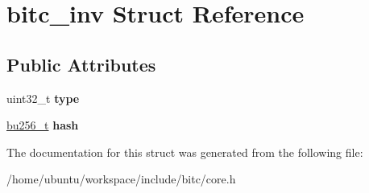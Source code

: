\hypertarget{structbitc__inv}{\section{bitc\-\_\-inv Struct Reference}
\label{structbitc__inv}
}
\subsection*{Public Attributes}
\begin{DoxyCompactItemize}
\item 
\hypertarget{structbitc__inv_abbb12745778b66b39d7472cb221ea79b}{uint32\-\_\-t {\bfseries type}}\label{structbitc__inv_abbb12745778b66b39d7472cb221ea79b}

\item 
\hypertarget{structbitc__inv_adb36479e5f33d874bb689b398cffaa2f}{\hyperlink{structbu256}{bu256\-\_\-t} {\bfseries hash}}\label{structbitc__inv_adb36479e5f33d874bb689b398cffaa2f}

\end{DoxyCompactItemize}


The documentation for this struct was generated from the following file\-:\begin{DoxyCompactItemize}
\item 
/home/ubuntu/workspace/include/bitc/core.\-h\end{DoxyCompactItemize}
